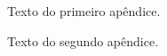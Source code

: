 \begin{apendicesenv}



    Texto do primeiro apêndice.


    Texto do segundo apêndice.

\end{apendicesenv}